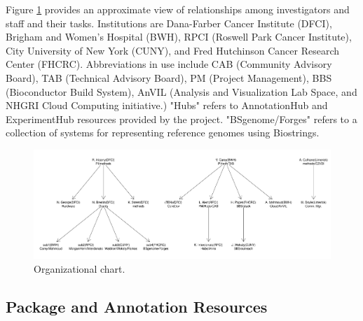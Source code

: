 \documentclass[letterpaper]{article}
\begin{document}
Figure \ref{fig:org-chart} provides an approximate view of
relationships among investigators and staff and their tasks.
Institutions are Dana-Farber Cancer Institute (DFCI),
Brigham and Women's Hospital (BWH), RPCI (Roswell Park
Cancer Institute), City University of New York (CUNY), and
Fred Hutchinson Cancer Research Center (FHCRC).  Abbreviations
in use include CAB (Community Advisory Board), TAB (Technical
Advisory Board), PM (Project Management), BBS (Bioconductor 
Build System), AnVIL (Analysis and Visualization Lab Space, and
NHGRI Cloud Computing initiative.)  "Hubs" refers to AnnotationHub
and ExperimentHub resources provided by the project.  "BSgenome/Forges"
refers to a collection of systems for representing reference genomes
using Biostrings.


\begin{figure}[b]
  \begin{center}
    \includegraphics[width=1.1\textwidth,height=!]{newgr2}
    \caption{Organizational chart.}
    \label{fig:org-chart}
  \end{center}
\end{figure}



\subsection{Package and Annotation Resources}
\end{document}
